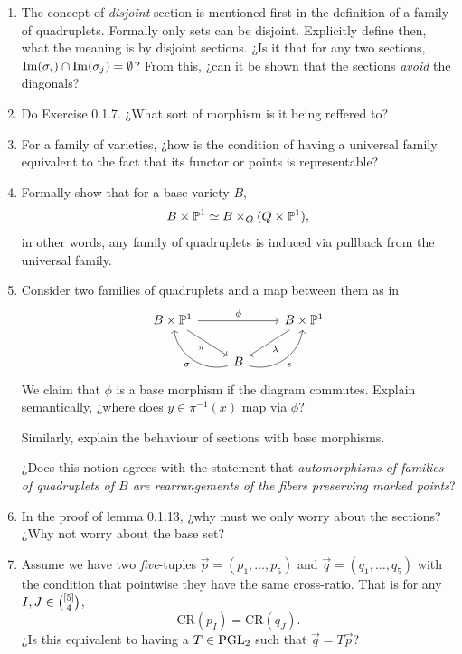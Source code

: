 \documentclass[12pt]{memoir}
\begin{document}
\begin{enumerate}
    \item The concept of \emph{disjoint} section is mentioned first in the definition of a family of quadruplets. Formally only sets can be disjoint. Explicitly define then, what the meaning is by disjoint sections. ¿Is it that for any two sections, \(\Im(\sigma_i)\cap\Im(\sigma_j)=\emptyset\)? From this, ¿can it be shown that the sections \emph{avoid} the diagonals?
    \item Do Exercise 0.1.7. ¿What sort of morphism is it being reffered to?
    \item For a family of varieties, ¿how is the condition of having a universal family equivalent to the fact that its functor or points is representable?
    \item Formally show that for a base variety \(B\),
          \[
              B\times\mathbb{P}^1\simeq B\times_Q(Q\times\mathbb{P}^1),
          \]
          in other words, any family of quadruplets is induced via pullback from the universal family.
    \item Consider two families of quadruplets and a map between them as in
          \[
              \begin{tikzcd}
                  B\x\bP^1 \arrow[rd, "\pi"'] \arrow[rr, "\phi"] &                                                                   & B\x\bP^1 \arrow[ld, "\la"] \\
                  & B \arrow[lu, "\sg", bend left=49] \arrow[ru, "s"', bend right=49] &
              \end{tikzcd}
          \]
          We claim that \(\phi\) is a base morphism if the diagram commutes. Explain semantically, ¿where does \(y\in \pi^{-1}(x)\) map via \(\phi\)?\par
          Similarly, explain the behaviour of sections with base morphisms.\par
          ¿Does this notion agrees with the statement that \emph{automorphisms of families of quadruplets of \(B\) are rearrangements of the fibers preserving marked points}?
    \item In the proof of lemma 0.1.13, ¿why must we only worry about the sections? ¿Why not worry about the base set?
    \item Assume we have two \emph{five}-tuples \(\vec{p}=(p_1,\dots,p_5)\) and \(\vec{q}=(q_1,\dots,q_5)\) with the condition that pointwise they have the same cross-ratio. That is for any \(I,J\in\binom{\left\lbrack5\right\rbrack}{4}\),
          \[
              \text{CR}(p_I)=\text{CR}(q_J).
          \]
          ¿Is this equivalent to having a \(T\in\operatorname{PGL}_2\) such that \(\vec{q}=T\vec{p}\)?
\end{enumerate}
\end{document}
